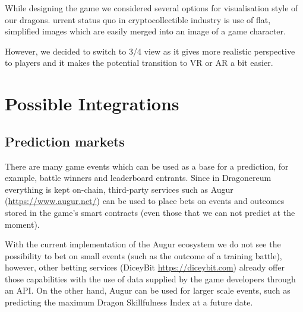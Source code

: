\documentclass[12pt]{article}
\begin{document}
While designing the game we considered several options for visualisation style of our dragons. urrent status quo in cryptocollectible industry is  use of flat, simplified images which are easily merged into an image of a game character.\par

However, we decided to switch to 3/4 view as it gives more realistic perspective to players and it makes the potential transition to VR or AR a bit easier.


\newpage
\par

\section{Possible Integrations}
 \label{Possible Integrations}  \par


\vspace{\baselineskip}

\vspace{\baselineskip}
\subsection{Prediction markets}\label{Prediction markets}\par

There are many game events which can be used as a base for a prediction, for example, battle winners and leaderboard entrants. Since in Dragonereum everything is kept on-chain, third-party services such as Augur (\url{https://www.augur.net/}) can be used to place bets on events and outcomes stored in the game’s smart contracts (even those that we can not predict at the moment).\par

With the current implementation of the Augur ecosystem we do not see the possibility to bet on small events (such as the outcome of a training battle), however, other betting services (DiceyBit \url{https://diceybit.com}) already offer those capabilities with the use of data supplied by the game developers through an API. On the other hand, Augur can be used for larger scale events, such as predicting the maximum Dragon Skillfulness Index at a future date.\par


\vspace{\baselineskip}
\end{document}
